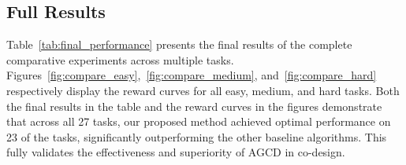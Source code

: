 \documentclass{article}
\begin{document}
    \subsection{Full Results}
    \label{subsubsec:full_results} Table~\ref{tab:final_performance} presents the
    final results of the complete comparative experiments across multiple tasks.
    Figures~\ref{fig:compare_easy},~\ref{fig:compare_medium}, and~\ref{fig:compare_hard}
    respectively display the reward curves for all easy, medium, and hard tasks.
    Both the final results in the table and the reward curves in the figures demonstrate
    that across all 27 tasks, our proposed method achieved optimal performance
    on 23 of the tasks, significantly outperforming the other baseline algorithms.
    This fully validates the effectiveness and superiority of AGCD in co-design.
\end{document}
